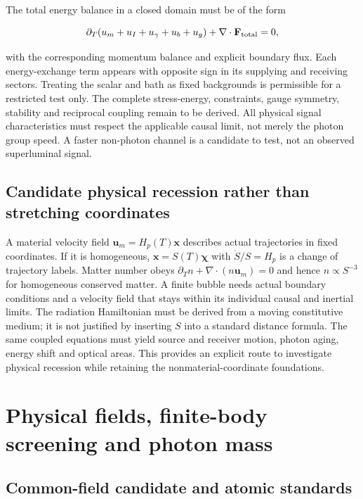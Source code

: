\documentclass[
  11pt,
  twoside]{article}
\begin{document}
The total energy balance in a closed domain must be of the form

\[\partial_T(u_m+u_I+u_\gamma+u_b+u_g)+\nabla\cdot\mathbf F_{\rm total}=0,\]

with the corresponding momentum balance and explicit boundary flux. Each
energy-exchange term appears with opposite sign in its supplying and
receiving sectors. Treating the scalar and bath as fixed backgrounds is
permissible for a restricted test only. The complete stress-energy,
constraints, gauge symmetry, stability and reciprocal coupling remain to
be derived. All physical signal characteristics must respect the
applicable causal limit, not merely the photon group speed. A faster
non-photon channel is a candidate to test, not an observed superluminal
signal.

\subsection{Candidate physical recession rather than stretching
coordinates}\label{candidate-physical-recession-rather-than-stretching-coordinates}

A material velocity field \(\mathbf u_m=H_p(T)\mathbf x\) describes
actual trajectories in fixed coordinates. If it is homogeneous,
\(\mathbf x=S(T)\boldsymbol\chi\) with \(\dot S/S=H_p\) is a change of
trajectory labels. Matter number obeys
\(\partial_T n+\nabla\cdot(n\mathbf u_m)=0\) and hence
\(n\propto S^{-3}\) for homogeneous conserved matter. A finite bubble
needs actual boundary conditions and a velocity field that stays within
its individual causal and inertial limits. The radiation Hamiltonian
must be derived from a moving constitutive medium; it is not justified
by inserting \(S\) into a standard distance formula. The same coupled
equations must yield source and receiver motion, photon aging, energy
shift and optical areas. This provides an explicit route to investigate
physical recession while retaining the nonmaterial-coordinate
foundations.

\section{Physical fields, finite-body screening and photon
mass}\label{physical-fields-finite-body-screening-and-photon-mass}

\subsection{Common-field candidate and atomic
standards}\label{common-field-candidate-and-atomic-standards}
\end{document}
